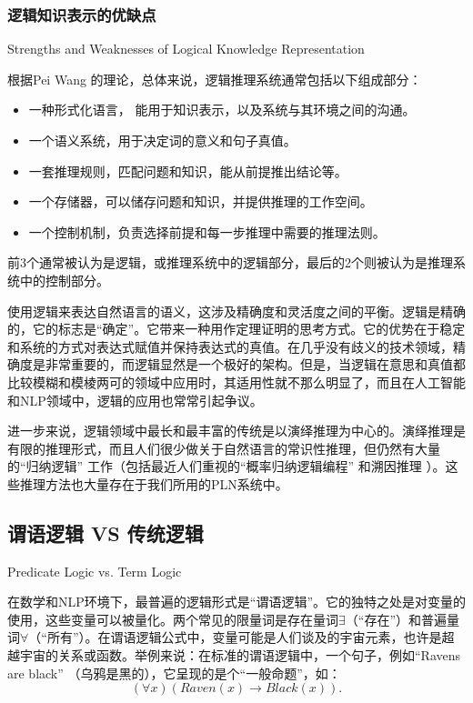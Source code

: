 \subsubsection{逻辑知识表示的优缺点}{Strengths and Weaknesses of Logical Knowledge Representation}

根据Pei Wang \cite{Wang2006}的理论，总体来说，逻辑推理系统通常包括以下组成部分：

\begin{itemize}
\item 一种形式化语言， 能用于知识表示，以及系统与其环境之间的沟通。
\item 一个语义系统，用于决定词的意义和句子真值。
\item 一套推理规则，匹配问题和知识，能从前提推出结论等。
\item 一个存储器，可以储存问题和知识，并提供推理的工作空间。
\item 一个控制机制，负责选择前提和每一步推理中需要的推理法则。
\end{itemize}

\noindent 前3个通常被认为是逻辑，或推理系统中的逻辑部分，最后的2个则被认为是推理系统中的控制部分。

使用逻辑来表达自然语言的语义，这涉及精确度和灵活度之间的平衡。逻辑是精确的，它的标志是“确定”。它带来一种用作定理证明的思考方式。它的优势在于稳定和系统的方式对表达式赋值并保持表达式的真值。在几乎没有歧义的技术领域，精确度是非常重要的，而逻辑显然是一个极好的架构。但是，当逻辑在意思和真值都比较模糊和模棱两可的领域中应用时，其适用性就不那么明显了，而且在人工智能和NLP领域中，逻辑的应用也常常引起争议。

进一步来说，逻辑领域中最长和最丰富的传统是以演绎推理为中心的。演绎推理是有限的推理形式，而且人们很少做关于自然语言的常识性推理，但仍然有大量的“归纳逻辑”\cite{Muggleton1994} \cite{Holland1989}工作（包括最近人们重视的“概率归纳逻辑编程” \cite{Riguzzi2014}和溯因推理\cite{Queiroz2005} \cite{Menzies1996}）。这些推理方法也大量存在于我们所用的PLN系统中。


\subsection{谓语逻辑 VS 传统逻辑}{Predicate Logic vs. Term Logic}

在数学和NLP环境下，最普遍的逻辑形式是“谓语逻辑”。它的独特之处是对变量的使用，这些变量可以被量化。两个常见的限量词是存在量词$\exists$（“存在”）和普遍量词$\forall$（“所有”）。在谓语逻辑公式中，变量可能是人们谈及的宇宙元素，也许是超越宇宙的关系或函数。举例来说：在标准的谓语逻辑中，一个句子，例如“Ravens are black” （乌鸦是黑的），它呈现的是个“一般命题”，如：
$$
(\forall x)(Raven(x) \rightarrow Black(x)).
$$

